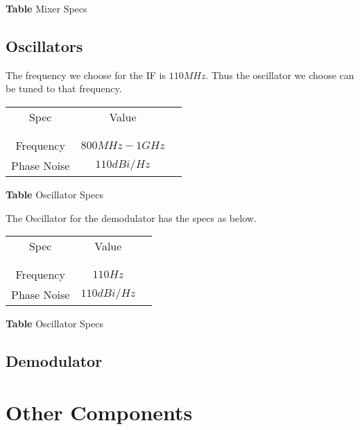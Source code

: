 \documentclass[]{article}
\begin{document}
        \begin{center}
            \textbf{Table} Mixer Specs
        \end{center}

    \subsection{Oscillators}
        The frequency we choose for the IF is $110MHz$. Thus the oscillator we
        choose can be tuned to that frequency.

        \begin{center}
            \begin{tabular}{c c c}
                Spec & Value \\ \\ \hline \\
                Frequency & $800MHz-1GHz$ \\
                Phase Noise & $110dBi/Hz$ \\
            \end{tabular}
        \end{center}

        \begin{center}
            \textbf{Table} Oscillator Specs
        \end{center}

        The Oscillator for the demodulator has the specs as below.

        \begin{center}
            \begin{tabular}{c c c}
                Spec & Value \\ \\ \hline \\
                Frequency & $110Hz$ \\
                Phase Noise & $110dBi/Hz$ \\
            \end{tabular}
        \end{center}

        \begin{center}
            \textbf{Table} Oscillator Specs
        \end{center}

    \subsection{Demodulator}
\section{Other Components}
\end{document}

